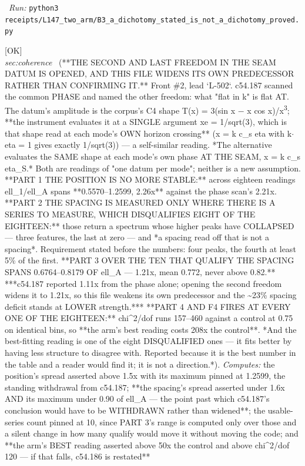 \begin{description}
\ \emph{Run:} \texttt{python3 receipts/L147\_two\_arm/B3\_a\_dichotomy\_stated\_is\_not\_a\_dichotomy\_proved.py}
\item[\rcptlabel{P15_both_datum_freedoms_opened_and_the_spacing_still_holds}{P15R92}\textbf{P15R92}\quad\texttt{P15\_both\_datum\_freedoms\_opened\_and\_the\_spacing\_still\_holds}]\hfill\textsf{[OK]}\\
\textit{sec:coherence} \ (**THE SECOND AND LAST FREEDOM IN THE SEAM DATUM IS OPENED, AND THIS FILE WIDENS ITS OWN PREDECESSOR RATHER THAN CONFIRMING IT.** Front \#2, lead `L-502`. c54.187 scanned the common PHASE and named the other freedom: what "flat in k" is flat AT. The datum's amplitude is the corpus's C4 shape T(x) = 3(sin x \ensuremath{-} x cos x)/x\textsuperscript{3}; **the instrument evaluates it at a SINGLE argument xe = 1/sqrt(3), which is that shape read at each mode's OWN horizon crossing** (x = k c\_s eta with k\ensuremath{\cdot}eta = 1 gives exactly 1/sqrt(3)) --- a self-similar reading. *The alternative evaluates the SAME shape at each mode's own phase AT THE SEAM, x = k c\_s eta\_S.* Both are readings of "one datum per mode"; neither is a new assumption. **PART 1 THE POSITION IS NO MORE STABLE:** across eighteen readings ell\_1/ell\_A spans **0.5570--1.2599, 2.26x** against the phase scan's 2.21x. **PART 2 THE SPACING IS MEASURED ONLY WHERE THERE IS A SERIES TO MEASURE, WHICH DISQUALIFIES EIGHT OF THE EIGHTEEN:** those return a spectrum whose higher peaks have COLLAPSED --- three features, the last at zero --- and *a spacing read off that is not a spacing*. Requirement stated before the numbers: four peaks, the fourth at least 5\% of the first. **PART 3 OVER THE TEN THAT QUALIFY THE SPACING SPANS 0.6764--0.8179 OF ell\_A --- 1.21x, mean 0.772, never above 0.82.**  ***c54.187 reported 1.11x from the phase alone; opening the second freedom widens it to 1.21x, so this file weakens its own predecessor and the \textasciitilde{}23\% spacing deficit stands at LOWER strength.*** **PART 4 AND F4 FIRES AT EVERY ONE OF THE EIGHTEEN:** chi\textasciicircum{}2/dof runs 157--460 against a control at 0.75 on identical bins, so **the arm's best reading costs 208x the control**.  *And the best-fitting reading is one of the eight DISQUALIFIED ones --- it fits better by having less structure to disagree with. Reported because it is the best number in the table and a reader would find it; it is not a direction.*). 
\emph{Computes:} the position's spread asserted above 1.5x with its maximum pinned at 1.2599, the standing withdrawal from c54.187; **the spacing's spread asserted under 1.6x AND its maximum under 0.90 of ell\_A --- the point past which c54.187's conclusion would have to be WITHDRAWN rather than widened**; the usable-series count pinned at 10, since PART 3's range is computed only over those and a silent change in how many qualify would move it without moving the code; and **the arm's BEST reading asserted above 50x the control and above chi\textasciicircum{}2/dof 120 --- if that falls, c54.186 is restated**

\end{description}

